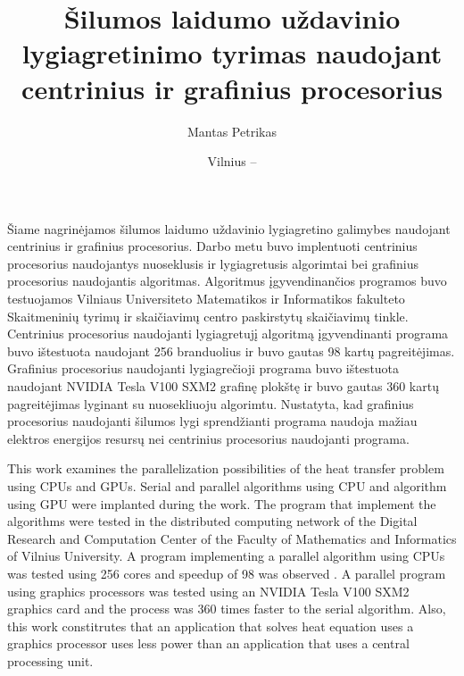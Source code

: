 \documentclass{VUMIFPSbakalaurinis}
\title{Šilumos laidumo uždavinio lygiagretinimo tyrimas naudojant centrinius ir grafinius procesorius}
\author{Mantas Petrikas}
\date{Vilnius – \the\year}
\begin{document}
\maketitle



Šiame nagrinėjamos šilumos laidumo uždavinio lygiagretino galimybes naudojant centrinius ir grafinius procesorius.
Darbo metu buvo implentuoti centrinius procesorius naudojantys nuoseklusis ir lygiagretusis algorimtai bei grafinius procesorius naudojantis algoritmas.
Algoritmus įgyvendinančios programos buvo testuojamos Vilniaus Universiteto Matematikos ir Informatikos fakulteto Skaitmeninių tyrimų ir skaičiavimų centro paskirstytų skaičiavimų tinkle.
Centrinius procesorius naudojanti lygiagretujį algoritmą įgyvendinanti programa buvo ištestuota naudojant 256 branduolius ir buvo gautas 98 kartų pagreitėjimas.
Grafinius procesorius naudojanti lygiagrečioji programa buvo ištestuota naudojant NVIDIA Tesla V100 SXM2 grafinę plokštę ir buvo gautas 360 kartų pagreitėjimas lyginant su nuosekliuoju algorimtu.
Nustatyta, kad grafinius procesorius naudojanti šilumos lygi sprendžianti programa naudoja mažiau elektros energijos resursų nei centrinius procesorius naudojanti programa.




This work examines the parallelization possibilities of the heat transfer problem using CPUs and GPUs.
Serial and parallel algorithms using CPU and algorithm using GPU were implanted during the work.
The program that implement the algorithms were tested in the distributed computing network of the Digital Research and Computation Center of the Faculty of Mathematics and Informatics of Vilnius University.
A program implementing a parallel algorithm using CPUs was tested using 256 cores and speedup of 98 was observed .
A parallel program using graphics processors was tested using an NVIDIA Tesla V100 SXM2 graphics card and the process was 360 times faster to the serial algorithm.
Also, this work constitrutes that an application that solves heat equation uses a graphics processor uses less power than an application that uses a central processing unit.

\tableofcontents


\end{document}
